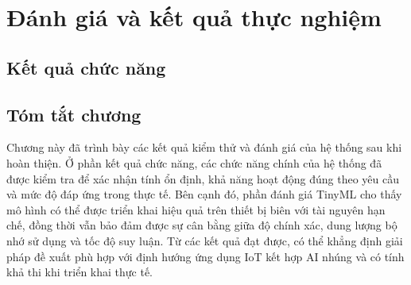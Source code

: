 \newpage
\section{Đánh giá và kết quả thực nghiệm}

\subsection{Kết quả chức năng}


\subsection{Tóm tắt chương}

Chương này đã trình bày các kết quả kiểm thử và đánh giá của hệ thống sau khi hoàn thiện. Ở phần kết quả chức năng, các chức năng chính của hệ thống đã được kiểm tra để xác nhận tính ổn định, khả năng hoạt động đúng theo yêu cầu và mức độ đáp ứng trong thực tế. Bên cạnh đó, phần đánh giá TinyML cho thấy mô hình có thể được triển khai hiệu quả trên thiết bị biên với tài nguyên hạn chế, đồng thời vẫn bảo đảm được sự cân bằng giữa độ chính xác, dung lượng bộ nhớ sử dụng và tốc độ suy luận. Từ các kết quả đạt được, có thể khẳng định giải pháp đề xuất phù hợp với định hướng ứng dụng IoT kết hợp AI nhúng và có tính khả thi khi triển khai thực tế.


